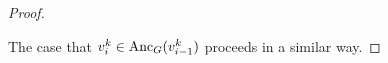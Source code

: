 \begin{proof}
\begin{itemize}
  \end{itemize}
  The case that $v^k_{i} \in \mathrm{Anc}_G(v^k_{i-1})$ proceeds in a similar way.


\end{proof}

